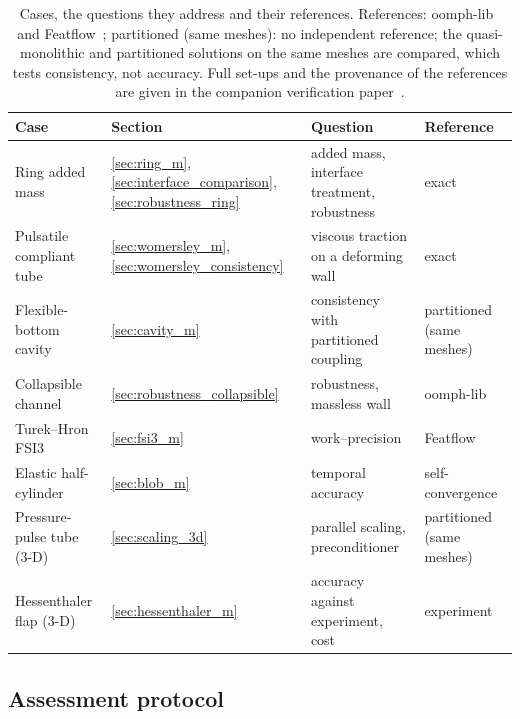 \begin{table}[htbp]
	\centering
	\footnotesize
	\setlength{\tabcolsep}{4pt}
	\caption{Cases, the questions they address and their references. References: oomph-lib~\protect\citep{Heil2006} and Featflow~\protect\citep{Turek2006}; partitioned (same meshes): no independent reference; the quasi-monolithic and partitioned solutions on the same meshes are compared, which tests consistency, not accuracy. Full set-ups and the provenance of the references are given in the companion verification paper~\protect\citep{CardiffFSIVerification2026}.}
	\label{tab:case_overview}
	\begin{tabular}{llll}
		\toprule
		Case & Section & Question & Reference \\
		\midrule
		Ring added mass & \ref{sec:ring_m}, \ref{sec:interface_comparison}, \ref{sec:robustness_ring} & added mass, interface treatment, robustness & exact \\
		Pulsatile compliant tube & \ref{sec:womersley_m}, \ref{sec:womersley_consistency} & viscous traction on a deforming wall & exact \\
		Flexible-bottom cavity & \ref{sec:cavity_m} & consistency with partitioned coupling & partitioned (same meshes) \\
		Collapsible channel & \ref{sec:robustness_collapsible} & robustness, massless wall & oomph-lib \\
		Turek--Hron FSI3 & \ref{sec:fsi3_m} & work--precision & Featflow \\
		Elastic half-cylinder & \ref{sec:blob_m} & temporal accuracy & self-convergence \\
		Pressure-pulse tube (3-D) & \ref{sec:scaling_3d} & parallel scaling, preconditioner & partitioned (same meshes) \\
		Hessenthaler flap (3-D) & \ref{sec:hessenthaler_m} & accuracy against experiment, cost & experiment~\citep{Hessenthaler2017a} \\
		\bottomrule
	\end{tabular}
\end{table}

\subsection{Assessment protocol}\label{sec:protocol}

